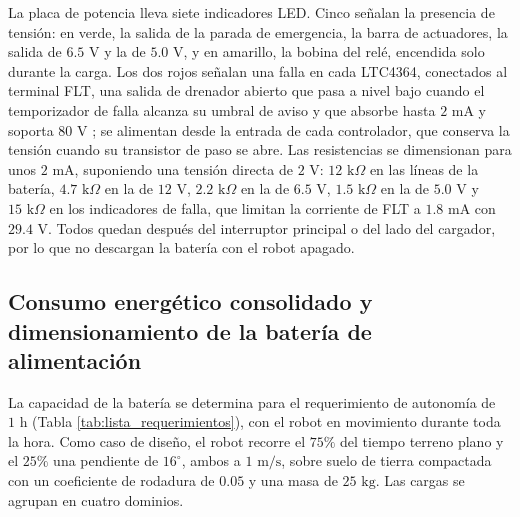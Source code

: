 \documentclass[../../General.tex]{subfiles}
\begin{document}
La placa de potencia lleva siete indicadores LED. Cinco señalan la presencia de tensión: en verde, la salida de la parada de emergencia, la barra de actuadores, la salida de $6.5\text{ V}$ y la de $5.0\text{ V}$, y en amarillo, la bobina del relé, encendida solo durante la carga. Los dos rojos señalan una falla en cada LTC4364, conectados al terminal FLT, una salida de drenador abierto que pasa a nivel bajo cuando el temporizador de falla alcanza su umbral de aviso y que absorbe hasta $2\text{ mA}$ y soporta $80\text{ V}$ \citep{adi_ltc4364}; se alimentan desde la entrada de cada controlador, que conserva la tensión cuando su transistor de paso se abre. Las resistencias se dimensionan para unos $2\text{ mA}$, suponiendo una tensión directa de $2\text{ V}$: $12\text{ k}\Omega$ en las líneas de la batería, $4.7\text{ k}\Omega$ en la de $12\text{ V}$, $2.2\text{ k}\Omega$ en la de $6.5\text{ V}$, $1.5\text{ k}\Omega$ en la de $5.0\text{ V}$ y $15\text{ k}\Omega$ en los indicadores de falla, que limitan la corriente de FLT a $1.8\text{ mA}$ con $29.4\text{ V}$. Todos quedan después del interruptor principal o del lado del cargador, por lo que no descargan la batería con el robot apagado.

\subsection{Consumo energético consolidado y dimensionamiento de la batería de alimentación}\label{subsec:balance_energia}

La capacidad de la batería se determina para el requerimiento de autonomía de $1\text{ h}$ (Tabla \ref{tab:lista_requerimientos}), con el robot en movimiento durante toda la hora. Como caso de diseño, el robot recorre el $75\%$ del tiempo terreno plano y el $25\%$ una pendiente de $16^\circ$, ambos a $1\text{ m/s}$, sobre suelo de tierra compactada con un coeficiente de rodadura de $0.05$ y una masa de $25\text{ kg}$. Las cargas se agrupan en cuatro dominios.
\end{document}
